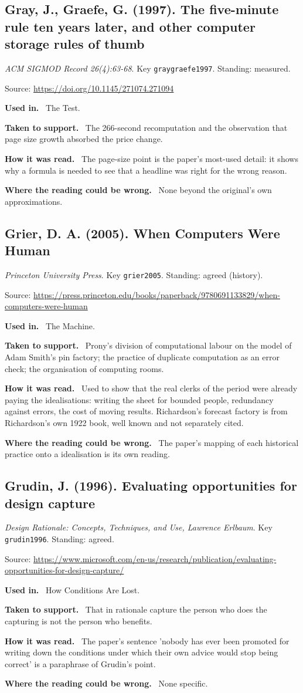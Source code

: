 \documentclass[11pt,oneside]{article}
\newcommand{\field}[1]{\par\noindent\textbf{\color{accent}#1.}\ }
\begin{document}
\hypertarget{src:graygraefe1997}{}
\subsection*{Gray, J., Graefe, G. (1997). The five-minute rule ten years later, and other computer storage rules of thumb}
\noindent\small\emph{ACM SIGMOD Record 26(4):63-68}. Key \texttt{graygraefe1997}. Standing: measured.
\par\noindent\small Source: \url{https://doi.org/10.1145/271074.271094}
\normalsize
\field{Used in} The Test.
\field{Taken to support} The 266-second recomputation and the observation that page size growth absorbed the price change.
\field{How it was read} The page-size point is the paper's most-used detail: it shows why a formula is needed to see that a headline was right for the wrong reason.
\field{Where the reading could be wrong} None beyond the original's own approximations.

\hypertarget{src:grier2005}{}
\subsection*{Grier, D. A. (2005). When Computers Were Human}
\noindent\small\emph{Princeton University Press}. Key \texttt{grier2005}. Standing: agreed (history).
\par\noindent\small Source: \url{https://press.princeton.edu/books/paperback/9780691133829/when-computers-were-human}
\normalsize
\field{Used in} The Machine.
\field{Taken to support} Prony's division of computational labour on the model of Adam Smith's pin factory; the practice of duplicate computation as an error check; the organisation of computing rooms.
\field{How it was read} Used to show that the real clerks of the period were already paying the idealisations: writing the sheet for bounded people, redundancy against errors, the cost of moving results. Richardson's forecast factory is from Richardson's own 1922 book, well known and not separately cited.
\field{Where the reading could be wrong} The paper's mapping of each historical practice onto a idealisation is its own reading.

\hypertarget{src:grudin1996}{}
\subsection*{Grudin, J. (1996). Evaluating opportunities for design capture}
\noindent\small\emph{Design Rationale: Concepts, Techniques, and Use, Lawrence Erlbaum}. Key \texttt{grudin1996}. Standing: agreed.
\par\noindent\small Source: \url{https://www.microsoft.com/en-us/research/publication/evaluating-opportunities-for-design-capture/}
\normalsize
\field{Used in} How Conditions Are Lost.
\field{Taken to support} That in rationale capture the person who does the capturing is not the person who benefits.
\field{How it was read} The paper's sentence 'nobody has ever been promoted for writing down the conditions under which their own advice would stop being correct' is a paraphrase of Grudin's point.
\field{Where the reading could be wrong} None specific.
\end{document}
